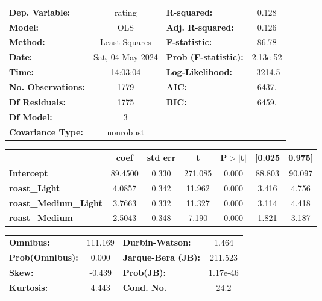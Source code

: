 \documentclass[11pt]{article}
\begin{document}
    \begin{center}
\begin{tabular}{lclc}
\toprule
\textbf{Dep. Variable:}       &      rating      & \textbf{  R-squared:         } &     0.128   \\
\textbf{Model:}               &       OLS        & \textbf{  Adj. R-squared:    } &     0.126   \\
\textbf{Method:}              &  Least Squares   & \textbf{  F-statistic:       } &     86.78   \\
\textbf{Date:}                & Sat, 04 May 2024 & \textbf{  Prob (F-statistic):} &  2.13e-52   \\
\textbf{Time:}                &     14:03:04     & \textbf{  Log-Likelihood:    } &   -3214.5   \\
\textbf{No. Observations:}    &        1779      & \textbf{  AIC:               } &     6437.   \\
\textbf{Df Residuals:}        &        1775      & \textbf{  BIC:               } &     6459.   \\
\textbf{Df Model:}            &           3      & \textbf{                     } &             \\
\textbf{Covariance Type:}     &    nonrobust     & \textbf{                     } &             \\
\bottomrule
\end{tabular}
\begin{tabular}{lcccccc}
                              & \textbf{coef} & \textbf{std err} & \textbf{t} & \textbf{P$> |$t$|$} & \textbf{[0.025} & \textbf{0.975]}  \\
\midrule
\textbf{Intercept}            &      89.4500  &        0.330     &   271.085  &         0.000        &       88.803    &       90.097     \\
\textbf{roast\_Light}         &       4.0857  &        0.342     &    11.962  &         0.000        &        3.416    &        4.756     \\
\textbf{roast\_Medium\_Light} &       3.7663  &        0.332     &    11.327  &         0.000        &        3.114    &        4.418     \\
\textbf{roast\_Medium}        &       2.5043  &        0.348     &     7.190  &         0.000        &        1.821    &        3.187     \\
\bottomrule
\end{tabular}
\begin{tabular}{lclc}
\textbf{Omnibus:}       & 111.169 & \textbf{  Durbin-Watson:     } &    1.464  \\
\textbf{Prob(Omnibus):} &   0.000 & \textbf{  Jarque-Bera (JB):  } &  211.523  \\
\textbf{Skew:}          &  -0.439 & \textbf{  Prob(JB):          } & 1.17e-46  \\
\textbf{Kurtosis:}      &   4.443 & \textbf{  Cond. No.          } &     24.2  \\
\bottomrule
\end{tabular}
\end{center}
\end{document}
